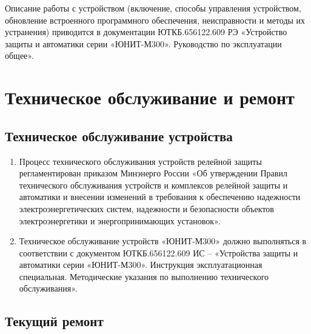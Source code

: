 \documentclass[a4paper, 12pt, table, hidelinks, DIV=calc]{extarticle}
\begin{document}
    \par
    Описание работы с устройством (включение, способы управления устройством, обновление встроенного программного обеспечения, неисправности и методы их устранения) приводится в документации ЮТКБ.656122.609 РЭ «Устройство защиты и автоматики серии «ЮНИТ-М300». Руководство по эксплуатации общее».\newpage
\color{unidarkgreen}\section[Техническое обслуживание и ремонт]{Техническое обслуживание и ремонт}\label{sec:techrepair}
\color{black}

\color{unidarkgreen}\subsection{Техническое обслуживание устройства}\color{black}

\begin{enumerate}[label=\arabic{section}.\arabic{subsection}.\arabic*, labelsep=4pt, leftmargin=0pt, itemindent=57pt]

\item\sloppy
Процесс  технического  обслуживания  устройств  релейной  защиты  регламентирован  приказом Минэнерго  России  «Об  утверждении  Правил  технического  обслуживания  устройств  и  комплексов релейной  защиты  и  автоматики  и  внесении  изменений  в  требования  к  обеспечению  надежности электроэнергетических  систем,  надежности  и  безопасности  объектов  электроэнергетики  и энергопринимающих установок».
\item
Техническое обслуживание устройств «ЮНИТ-М300» должно выполняться в соответствии с документом ЮТКБ.656122.609 ИС – «Устройства защиты и автоматики серии «ЮНИТ-М300». Инструкция эксплуатационная специальная. Методические указания по выполнению технического обслуживания».

\end{enumerate}

\color{unidarkgreen}\subsection{Текущий ремонт}\color{black}
\end{document}
